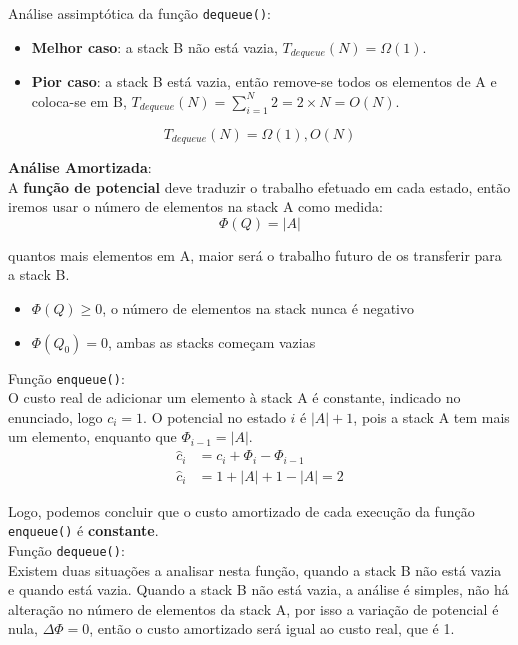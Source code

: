 \documentclass[a4paper,11pt]{article}
\begin{document}
	\noindent Análise assimptótica da função \texttt{dequeue()}:
	\begin{itemize}
		\item \textbf{Melhor caso}: a stack B não está vazia, $ T_{dequeue}(N) = \Omega(1) $.
		\item \textbf{Pior caso}: a stack B está vazia, então remove-se todos os elementos de A e coloca-se em B, $ T_{dequeue}(N) = \sum_{i=1}^{N} 2 = 2 \times N = O(N) $.
	\end{itemize}
	\[
		T_{dequeue}(N) = \Omega(1), O(N)
	\]
	
	\noindent \textbf{Análise Amortizada}:\\
	
	\noindent A \textbf{função de potencial} deve traduzir o trabalho efetuado em cada estado, então iremos usar o número de elementos na stack A como medida:
	\[
		\Phi(Q) = |A|
	\]
	
	\noindent quantos mais elementos em A, maior será o trabalho futuro de os transferir para a stack B.
	\begin{itemize}
		\item $\Phi(Q) \geq 0$, o número de elementos na stack nunca é negativo
		\item $\Phi(Q_0) = 0$, ambas as stacks começam vazias
	\end{itemize}
	
	\noindent Função \texttt{enqueue()}:\\
	
	\noindent O custo real de adicionar um elemento à stack A é constante, indicado no enunciado, logo $c_i = 1$. O potencial no estado $i$ é $|A|+1$, pois a stack A tem mais um elemento, enquanto que $\Phi_{i-1} = |A|$.
	\begin{align*}
		\hat{c}_i & = c_i + \Phi_i - \Phi_{i-1} \\
		\hat{c}_i & = 1 + |A| + 1 - |A| = 2
	\end{align*}
	
	\noindent Logo, podemos concluir que o custo amortizado de cada execução da função \texttt{enqueue()} é \textbf{constante}.\\
	
	\noindent Função \texttt{dequeue()}:\\
	
	\noindent Existem duas situações a analisar nesta função, quando a stack B não está vazia e quando está vazia. Quando a stack B não está vazia, a análise é simples, não há alteração no número de elementos da stack A, por isso a variação de potencial é nula, $\Delta \Phi = 0$, então o custo amortizado será igual ao custo real, que é 1.\\
	
\end{document}

